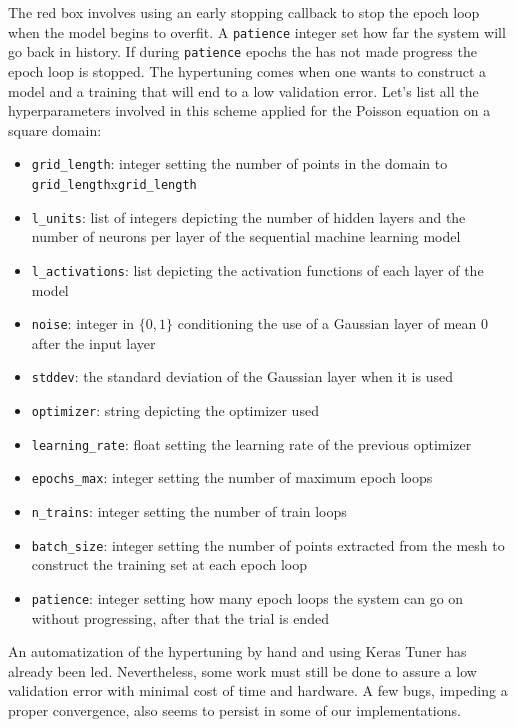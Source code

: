 The red box involves using an early stopping callback to stop the epoch loop when the model begins to overfit. A \texttt{patience} integer set how far the system will go back in history. If during \texttt{patience} epochs the has not made progress the epoch loop is stopped.
\newline
The hypertuning comes when one wants to construct a model and a training that will end to a low validation error. Let's list all the hyperparameters involved in this scheme applied for the Poisson equation on a square domain:
\begin{itemize}
    \item \texttt{grid\_length}: integer setting the number of points in the domain to \texttt{grid\_length}x\texttt{grid\_length}
    \item \texttt{l\_units}: list of integers depicting the number of hidden layers and the number of neurons per layer of the sequential machine learning model
    \item \texttt{l\_activations}: list depicting the activation functions of each layer of the model
    \item \texttt{noise}: integer in $\{0,1\}$ conditioning the use of a Gaussian layer of mean $0$ after the input layer
    \item \texttt{stddev}: the standard deviation of the Gaussian layer when it is used
    \item \texttt{optimizer}: string depicting the optimizer used
    \item \texttt{learning\_rate}: float setting the learning rate of the previous optimizer
    \item \texttt{epochs\_max}: integer setting the number of maximum epoch loops
    \item \texttt{n\_trains}: integer setting the number of train loops
    \item \texttt{batch\_size}: integer setting the number of points extracted from the mesh to construct the training set at each epoch loop
    \item \texttt{patience}: integer setting how many epoch loops the system can go on without progressing, after that the trial is ended
\end{itemize}

An automatization of the hypertuning by hand and using Keras Tuner has already been led. Nevertheless, some work must still be done to assure a low validation error with minimal cost of time and hardware. A few bugs, impeding a proper convergence, also seems to persist in some of our implementations.

